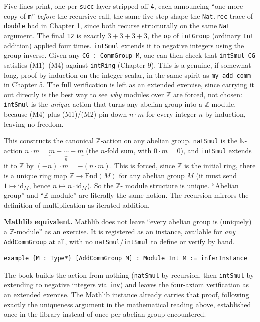 Five lines print, one per \texttt{succ} layer stripped off \texttt{4}, each announcing ``one more copy of \texttt{m}'' \emph{before} the recursive call, the same five-step shape the \texttt{Nat.rec} trace of \texttt{double} had in Chapter 1, since both recurse structurally on the same \texttt{Nat} argument. The final \texttt{12} is exactly \(3+3+3+3\), the \texttt{op} of \texttt{intGroup} (ordinary \texttt{Int} addition) applied four times. \texttt{intSmul} extends it to negative integers using the group inverse. Given any \texttt{CG : CommGroup M}, one can then check that \texttt{intSmul CG} satisfies (M1)--(M4) against \texttt{intRing} (Chapter 9). This is a genuine, if somewhat long, proof by induction on the integer scalar, in the same spirit as \texttt{my\_\allowbreak{}add\_\allowbreak{}comm} in Chapter 5. The full verification is left as an extended exercise, since carrying it out directly is the best way to see \emph{why} modules over \(\mathbb{Z}\) are forced, not chosen: \texttt{intSmul} is the \emph{unique} action that turns any abelian group into a \(\mathbb{Z}\)-module, because (M4) plus (M1)/(M2) pin down \(n \cdot m\) for every integer \(n\) by induction, leaving no freedom.

\begin{mathreading}

This constructs the canonical \(\mathbb{Z}\)-action on any abelian group. \texttt{natSmul} is the \(\mathbb{N}\)-action \(n\cdot m = \underbrace{m + \cdots + m}_{n}\) (the \(n\)-fold sum, with \(0\cdot m = 0\)), and \texttt{intSmul} extends it to \(\mathbb{Z}\) by \((-n)\cdot m = -(n\cdot m)\). This is forced, since \(\mathbb{Z}\) is the initial ring, there is a unique ring map \(\mathbb{Z} \to
\mathrm{End}(M)\) for any abelian group \(M\) (it must send \(1 \mapsto
\mathrm{id}_M\), hence \(n \mapsto n\cdot\mathrm{id}_M\)). So the \(\mathbb{Z}\)- module structure is unique. ``Abelian group'' and ``\(\mathbb{Z}\)-module'' are literally the same notion. The recursion mirrors the definition of multiplication-as-iterated-addition.

\end{mathreading}

\textbf{Mathlib equivalent.} Mathlib does not leave ``every abelian group is (uniquely) a \(\mathbb{Z}\)-module'' as an exercise. It is registered as an instance, available for \emph{any} \texttt{AddCommGroup} at all, with no \texttt{natSmul}/\texttt{intSmul} to define or verify by hand.

\begin{lstlisting}
example {M : Type*} [AddCommGroup M] : Module Int M := inferInstance
\end{lstlisting}

The book builds the action from nothing (\texttt{natSmul} by recursion, then \texttt{intSmul} by extending to negative integers via \texttt{inv}) and leaves the four-axiom verification as an extended exercise. The Mathlib instance already carries that proof, following exactly the uniqueness argument in the mathematical reading above, established once in the library instead of once per abelian group encountered.
